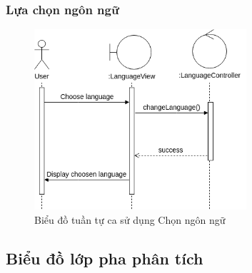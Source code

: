 \subsubsection{Lựa chọn ngôn ngữ}
\begin{figure}[H]
    \centering
    \includegraphics[width=0.7\textwidth]{img2/Analysis-Chọn ngôn ngữ.drawio.png}
    \caption{Biểu đồ tuần tự ca sử dụng Chọn ngôn ngữ}
\end{figure}

\subsection{Biểu đồ lớp pha phân tích}
